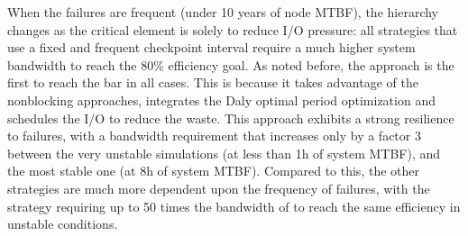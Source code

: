 When the failures are frequent (under 10 years of node MTBF), the
hierarchy changes as the critical element is solely to reduce  I/O
pressure: all strategies that use a fixed and frequent checkpoint
interval require a much higher system bandwidth to reach the 80\%
efficiency goal.  As noted before, the \cooperative approach is the
first to reach the bar in all cases. This is because it takes
advantage of the nonblocking approaches, integrates the Daly optimal
period optimization and schedules the I/O to reduce the waste.
This approach exhibits a strong resilience to failures, with a
bandwidth requirement that increases only by a factor 3 between the
very unstable simulations (at less than 1h of system MTBF), and the
most stable one (at 8h of system MTBF). Compared to this, the other
strategies are much more dependent upon the frequency of failures, with
the \propfixed strategy requiring up to 50 times the bandwidth of
\cooperative to reach the same efficiency in unstable conditions.
